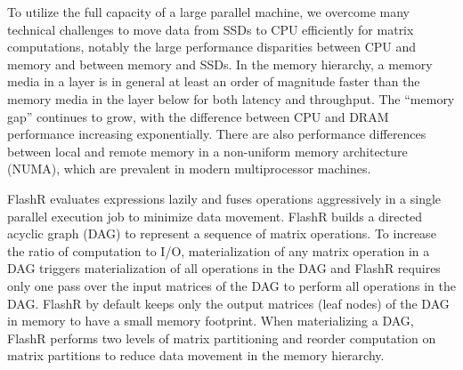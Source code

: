 

To utilize the full capacity of a large parallel machine, we overcome
many technical challenges to move data from SSDs to CPU efficiently for matrix
computations, notably the large performance disparities between CPU and memory
and between memory and SSDs. In the memory hierarchy, a memory media in a layer
is in general at least an order of magnitude faster than the memory media in
the layer below for both latency and throughput.
The ``memory gap'' \cite{Wilkes01} continues to grow, with 
the difference between CPU and DRAM performance increasing exponentially. 
There are also performance differences between
local and remote memory in a non-uniform memory architecture (NUMA), which are prevalent
in modern multiprocessor machines. 

FlashR evaluates expressions lazily and fuses operations aggressively
in a single parallel execution job to minimize data movement. FlashR
builds a directed acyclic graph (DAG) to represent a sequence of matrix
operations. To increase the ratio of computation to I/O, materialization
of any matrix operation in a DAG triggers materialization of all operations
in the DAG and FlashR requires only one pass over the input matrices of
the DAG to perform all operations in the DAG.
FlashR by default keeps only the output matrices (leaf nodes) of the DAG
in memory to have a small memory footprint. When materializing a DAG,
FlashR performs two levels of matrix partitioning and reorder computation
on matrix partitions to reduce data movement in the memory hierarchy.

